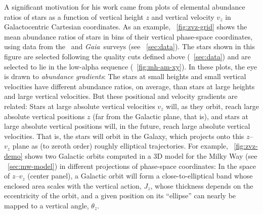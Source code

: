 \documentclass[modern]{aastex63}
\newcommand{\gaia}{\textsl{Gaia}}
\newcommand{\apogee}{\acronym{APOGEE}}
\begin{document}
A significant motivation for his work came from plots of elemental abundance
ratios of stars as a function of vertical height $z$ and vertical velocity $v_z$
in Galactocentric Cartesian coordinates.
As an example, \figurename~\ref{fig:zvz-grid} shows the mean abundance ratios of
stars in bins of their vertical phase-space coordinates, using data from the
\apogee\ and \gaia\ surveys (see \sectionname~\ref{sec:data}).
The stars shown in this figure are selected following the quality cuts defined
above (\sectionname~\ref{sec:data}) and are selected to lie in the low-alpha
sequence (\figurename~\ref{fig:mh-am-xy}).
In these plots, the eye is drawn to \emph{abundance gradients}:
The stars at small heights and small vertical velocities have different
abundance ratios, on average, than stars at large heights and large vertical
velocities.
But these positional and velocity gradients are related:
Stars at large absolute vertical velocities $v_z$ will, as they orbit, reach
large absolute vertical positions $z$ (far from the Galactic plane, that is),
and stars at large absolute vertical positions will, in the future, reach large
absolute vertical velocities.
That is, the stars will orbit in the Galaxy, which projects onto this $z$--$v_z$
plane as (to zeroth order) roughly elliptical trajectories.
For example, \figurename~\ref{fig:zvz-demo} shows two Galactic orbits computed
in a 3D model for the Milky Way (see \sectionname~\ref{sec:mw-model}) in
different projections of phase-space coordinates:
In the space of $z$--$v_z$ (center panel), a Galactic orbit will form a
close-to-elliptical band whose enclosed area scales with the vertical action,
$J_z$, whose thickness depends on the eccentricity of the orbit, and a given
position on its ``ellipse'' can nearly be mapped to a vertical angle,
$\theta_z$.
\end{document}
